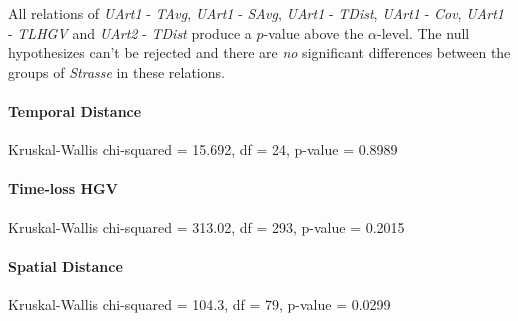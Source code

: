 All relations of \textit{UArt1} - \textit{TAvg}, \textit{UArt1} - \textit{SAvg}, \textit{UArt1} - \textit{TDist}, \textit{UArt1} - \textit{Cov}, \textit{UArt1} - \textit{TLHGV} and \textit{UArt2} - \textit{TDist} produce a $p$-value above the $\alpha$-level. The null hypothesizes can't be rejected and there are \textit{no} significant differences between the groups of \textit{Strasse} in these relations.


\paragraph{Temporal Distance}
Kruskal-Wallis chi-squared = 15.692, df = 24, p-value = 0.8989

\paragraph{Time-loss HGV}
Kruskal-Wallis chi-squared = 313.02, df = 293, p-value = 0.2015

\paragraph{Spatial Distance}
Kruskal-Wallis chi-squared = 104.3, df = 79, p-value = 0.0299

